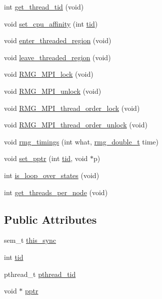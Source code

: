 \begin{DoxyCompactItemize}
\item 
int \hyperlink{class_base_thread_a2853c4986b07a66aab1cc6920617a6d6}{get\-\_\-thread\-\_\-tid} (void)
\item 
void \hyperlink{class_base_thread_a4ce9101a4bb0710a38b0185c479e98b3}{set\-\_\-cpu\-\_\-affinity} (int \hyperlink{class_base_thread_a98cb2fa092cfd40fcdc3992096e58db8}{tid})
\item 
void \hyperlink{class_base_thread_a7359b4e6a0b9c9cfba65ae6bc71579b1}{enter\-\_\-threaded\-\_\-region} (void)
\item 
void \hyperlink{class_base_thread_af49f0db38134e50c57b0fc7df0588dd2}{leave\-\_\-threaded\-\_\-region} (void)
\item 
void \hyperlink{class_base_thread_a0a6181d82b7292cf7de14bf8a5c5ce78}{R\-M\-G\-\_\-\-M\-P\-I\-\_\-lock} (void)
\item 
void \hyperlink{class_base_thread_a7f18dda8c6a7664e6b1b81d258ca8ae5}{R\-M\-G\-\_\-\-M\-P\-I\-\_\-unlock} (void)
\item 
void \hyperlink{class_base_thread_a3973f80b4c6b8dc40b0ed8fc24b5b15f}{R\-M\-G\-\_\-\-M\-P\-I\-\_\-thread\-\_\-order\-\_\-lock} (void)
\item 
void \hyperlink{class_base_thread_a73632ec3a4524b7679ada9e7141e853d}{R\-M\-G\-\_\-\-M\-P\-I\-\_\-thread\-\_\-order\-\_\-unlock} (void)
\item 
void \hyperlink{class_base_thread_ac5e2b09ea312b50398c3189ee2f013d4}{rmg\-\_\-timings} (int what, \hyperlink{rmgtypes_8h_aaa16921c14f121c56eaa42390a340db8}{rmg\-\_\-double\-\_\-t} time)
\item 
void \hyperlink{class_base_thread_a059cba78f699335588a2bb7df82daf95}{set\-\_\-pptr} (int \hyperlink{class_base_thread_a98cb2fa092cfd40fcdc3992096e58db8}{tid}, void $\ast$p)
\item 
int \hyperlink{class_base_thread_af29eccdcc3030f0e6fb871aa073f8a89}{is\-\_\-loop\-\_\-over\-\_\-states} (void)
\item 
int \hyperlink{class_base_thread_adaca1cce9591271eb6836b657dcde5d1}{get\-\_\-threads\-\_\-per\-\_\-node} (void)
\end{DoxyCompactItemize}
\subsection*{Public Attributes}
\begin{DoxyCompactItemize}
\item 
sem\-\_\-t \hyperlink{class_base_thread_accfa214a7f01edea97f022f60ac58ba9}{this\-\_\-sync}
\item 
int \hyperlink{class_base_thread_a98cb2fa092cfd40fcdc3992096e58db8}{tid}
\item 
pthread\-\_\-t \hyperlink{class_base_thread_a40086f0b84a2cf98eb1a0e0081d0055c}{pthread\-\_\-tid}
\item 
void $\ast$ \hyperlink{class_base_thread_a9a04cf502a8bf373cb1232f10db68133}{pptr}
\end{DoxyCompactItemize}

